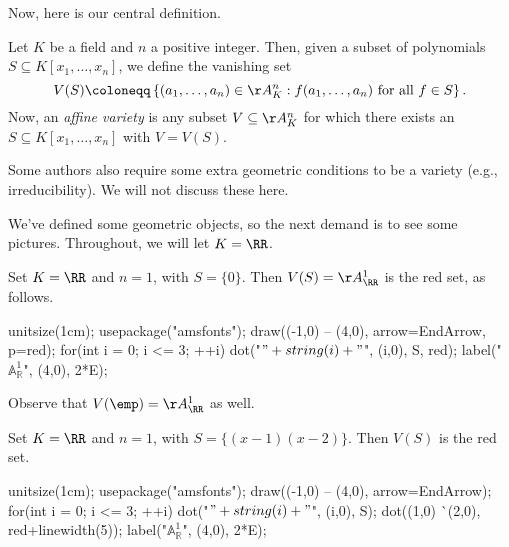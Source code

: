 \documentclass{article}
\begin{document}
Now, here is our central definition.
\begin{definition}
	Let $K$ be a field and $n$ a positive integer. Then, given a subset of polynomials $S\subseteq K[x_1,\ldots,x_n]$, we define the vanishing set
	\[V(S)\coloneqq\left\{(a_1,\ldots,a_n)\in\AA_K^n:f(a_1,\ldots,a_n)\text{ for all }f\in S\right\}.\]
	Now, an \textit{affine variety} is any subset $V\subseteq\AA_K^n$ for which there exists an $S\subseteq K[x_1,\ldots,x_n]$ with $V=V(S)$.
\end{definition}
\begin{remark}
	Some authors also require some extra geometric conditions to be a variety (e.g., irreducibility). We will not discuss these here.
\end{remark}
We've defined some geometric objects, so the next demand is to see some pictures. Throughout, we will let $K=\RR$.
\begin{example}
	Set $K=\RR$ and $n=1$, with $S=\{0\}$. Then $V(S)=\AA_\RR^1$ is the red set, as follows.
	\begin{center}
		\begin{asy}
			unitsize(1cm);
			usepackage("amsfonts");
			draw((-1,0) -- (4,0), arrow=EndArrow, p=red);
			for(int i = 0; i <= 3; ++i)
			{
				dot("$"+string(i)+"$", (i,0), S, red);
			}
			label("$\mathbb A_{\mathbb R}^1$", (4,0), 2*E);
		\end{asy}
	\end{center}
	Observe that $V(\emp)=\AA_\RR^1$ as well.
\end{example}
\begin{example}
	Set $K=\RR$ and $n=1$, with $S=\{(x-1)(x-2)\}$. Then $V(S)$ is the red set.
	\begin{center}
		\begin{asy}
			unitsize(1cm);
			usepackage("amsfonts");
			draw((-1,0) -- (4,0), arrow=EndArrow);
			for(int i = 0; i <= 3; ++i)
			{
				dot("$"+string(i)+"$", (i,0), S);
			}
			dot((1,0) ^^ (2,0), red+linewidth(5));
			label("$\mathbb A_{\mathbb R}^1$", (4,0), 2*E);
		\end{asy}
	\end{center}
\end{example}
\end{document}
